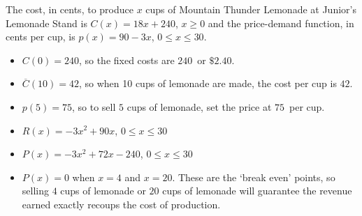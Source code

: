 {The cost, in cents, to produce $x$ cups of Mountain Thunder Lemonade at Junior's Lemonade Stand  is $C(x) = 18x + 240$, $x \geq 0$ and the price-demand function, in cents per cup,  is $p(x) = 90-3x$, $0 \leq x \leq 30$.}
{\begin{itemize}

\item  $C(0) = 240$, so the fixed costs are $240$\textcent \,  or $\$2.40$.

\item  $\overline{C}(10) = 42$, so when 10 cups of lemonade are made, the cost per cup is $42$\textcent.

\item  $p(5) = 75$, so to sell $5$ cups of lemonade, set the price at $75$\textcent \,  per cup.

\item $R(x) = -3x^2+90x$, $0 \leq x \leq 30$

\item  $P(x) = -3x^2+72x-240$, $0 \leq x \leq 30$

\item  $P(x) = 0$ when $x = 4$ and $x=20$.  These are the `break even' points, so selling $4$ cups of lemonade or $20$ cups of lemonade will guarantee the revenue earned exactly recoups the cost of production.

\end{itemize}
}